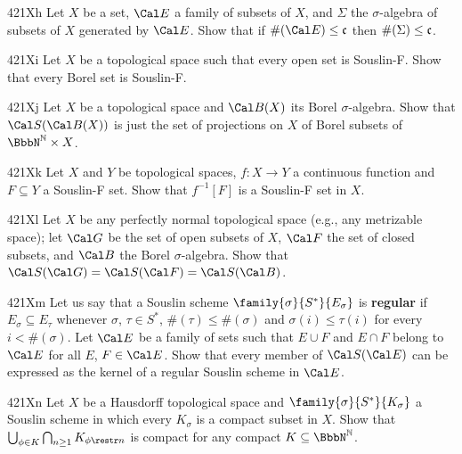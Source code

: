 {\spheader 421Xh Let $X$ be a set, $\Cal E$ a family of subsets of $X$,
and $\Sigma$ the $\sigma$-algebra of subsets of $X$ generated by
$\Cal E$.   Show that if $\#(\Cal E)\le\frak c$ then
$\#(\Sigma)\le\frak c$.

\spheader 421Xi Let $X$ be a topological space such that every open set
is Souslin-F.   Show that every Borel set is Souslin-F.

\spheader 421Xj Let $X$ be a topological space and $\Cal B(X)$ its Borel
$\sigma$-algebra.   Show that $\Cal S(\Cal B(X))$ is just the set of
projections on $X$ of Borel subsets of $\NN\times X$.   

\spheader 421Xk Let $X$ and $Y$ be topological spaces, $f:X\to Y$ a
continuous function and $F\subseteq Y$ a Souslin-F set.   Show that
$f^{-1}[F]$ is a Souslin-F set in $X$.

\spheader 421Xl Let $X$ be any perfectly normal topological space (e.g.,
any metrizable space);  let $\Cal G$ be the
set of open subsets of $X$, $\Cal F$ the set of closed subsets, and
$\Cal B$ the Borel $\sigma$-algebra.   Show that
$\Cal S(\Cal G)=\Cal S(\Cal F)=\Cal S(\Cal B)$.

\spheader 421Xm Let us say that a Souslin scheme
$\family{\sigma}{S^*}{E_{\sigma}}$ is {\bf regular} if
$E_{\sigma}\subseteq E_{\tau}$ whenever $\sigma$, $\tau\in S^*$,
$\#(\tau)\le\#(\sigma)$ and
$\sigma(i)\le\tau(i)$ for every $i<\#(\sigma)$.   Let $\Cal E$ be a
family of sets such that $E\cup F$ and $E\cap F$ belong to
$\Cal E$ for all $E$,
$F\in\Cal E$.   Show that every member of $\Cal S(\Cal E)$ can be
expressed as the kernel of a regular Souslin scheme in $\Cal E$.

\sqheader 421Xn Let $X$ be a Hausdorff topological space and
$\family{\sigma}{S^*}{K_{\sigma}}$ a Souslin scheme in which every
$K_{\sigma}$ is a compact subset in $X$.   Show that
$\bigcup_{\phi\in K}\bigcap_{n\ge 1}K_{\phi\restr n}$ is compact for any
compact $K\subseteq\NN$.

}
